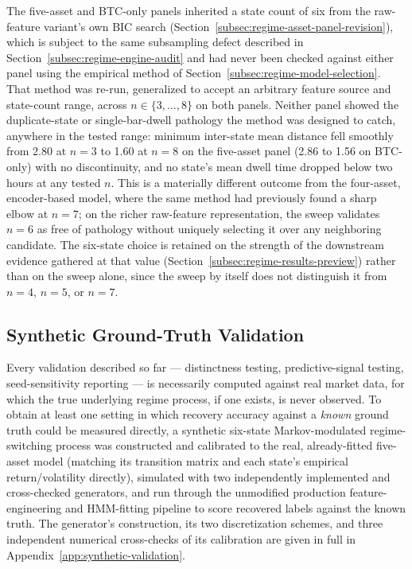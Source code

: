 The five-asset and BTC-only panels inherited a state count of six from the raw-feature variant's own BIC search (Section~\ref{subsec:regime-asset-panel-revision}), which is subject to the same subsampling defect described in Section~\ref{subsec:regime-engine-audit} and had never been checked against either panel using the empirical method of Section~\ref{subsec:regime-model-selection}. That method was re-run, generalized to accept an arbitrary feature source and state-count range, across $n \in \{3,\ldots,8\}$ on both panels. Neither panel showed the duplicate-state or single-bar-dwell pathology the method was designed to catch, anywhere in the tested range: minimum inter-state mean distance fell smoothly from 2.80 at $n=3$ to 1.60 at $n=8$ on the five-asset panel (2.86 to 1.56 on BTC-only) with no discontinuity, and no state's mean dwell time dropped below two hours at any tested $n$. This is a materially different outcome from the four-asset, encoder-based model, where the same method had previously found a sharp elbow at $n=7$; on the richer raw-feature representation, the sweep validates $n=6$ as free of pathology without uniquely selecting it over any neighboring candidate. The six-state choice is retained on the strength of the downstream evidence gathered at that value (Section~\ref{subsec:regime-results-preview}) rather than on the sweep alone, since the sweep by itself does not distinguish it from $n=4$, $n=5$, or $n=7$.

\subsection{Synthetic Ground-Truth Validation}
\label{subsec:regime-synthetic-validation}

Every validation described so far --- distinctness testing, predictive-signal testing, seed-sensitivity reporting --- is necessarily computed against real market data, for which the true underlying regime process, if one exists, is never observed. To obtain at least one setting in which recovery accuracy against a \emph{known} ground truth could be measured directly, a synthetic six-state Markov-modulated regime-switching process was constructed and calibrated to the real, already-fitted five-asset model (matching its transition matrix and each state's empirical return/volatility directly), simulated with two independently implemented and cross-checked generators, and run through the unmodified production feature-engineering and HMM-fitting pipeline to score recovered labels against the known truth. The generator's construction, its two discretization schemes, and three independent numerical cross-checks of its calibration are given in full in Appendix~\ref{app:synthetic-validation}.

